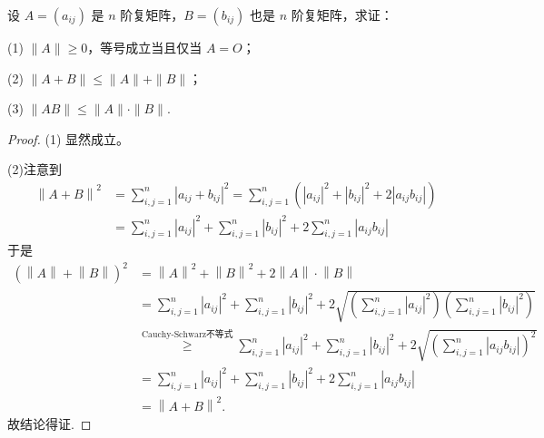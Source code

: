 \documentclass[../../main.tex]{subfiles}%
\begin{document}
\begin{proposition}[矩阵的范数的基本性质]\label{proposition:矩阵的范数的基本性质}
设 $A=(a_{ij})$ 是 $n$ 阶复矩阵，$B=(b_{ij})$ 也是 $n$ 阶复矩阵，求证：

(1) $\|A\|\geqslant  0$，等号成立当且仅当 $A = O$；

(2) $\|A + B\|\leqslant  \|A\| + \|B\|$；

(3) $\|AB\|\leqslant  \|A\|\cdot\|B\|$.
\end{proposition}
\begin{proof}

(1) 显然成立。

(2)注意到
\begin{align*}
\left\| A+B \right\| ^2&=\sum_{i,j=1}^n{\left| a_{ij}+b_{ij} \right|^2}=\sum_{i,j=1}^n{\left( \left| a_{ij} \right|^2+\left| b_{ij} \right|^2+2\left| a_{ij}b_{ij} \right| \right)}\\
&=\sum_{i,j=1}^n{\left| a_{ij} \right|^2}+\sum_{i,j=1}^n{\left| b_{ij} \right|^2}+2\sum_{i,j=1}^n{\left| a_{ij}b_{ij} \right|}
\end{align*}
于是
\begin{align*}
\left( \left\| A \right\| +\left\| B \right\| \right) ^2&=\left\| A \right\| ^2+\left\| B \right\| ^2+2\left\| A \right\| \cdot \left\| B \right\| \\
&=\sum_{i,j=1}^n{\left| a_{ij} \right|^2}+\sum_{i,j=1}^n{\left| b_{ij} \right|^2}+2\sqrt{\left( \sum_{i,j=1}^n{\left| a_{ij} \right|^2} \right) \left( \sum_{i,j=1}^n{\left| b_{ij} \right|^2} \right)}\\
&\overset{\text{Cauchy-Schwarz不等式}}{\geqslant}\sum_{i,j=1}^n{\left| a_{ij} \right|^2}+\sum_{i,j=1}^n{\left| b_{ij} \right|^2}+2\sqrt{\left( \sum_{i,j=1}^n{\left| a_{ij}b_{ij} \right|} \right) ^2}\\
&=\sum_{i,j=1}^n{\left| a_{ij} \right|^2}+\sum_{i,j=1}^n{\left| b_{ij} \right|^2}+2\sum_{i,j=1}^n{\left| a_{ij}b_{ij} \right|}\\
&=\left\| A+B \right\| ^2.
\end{align*}
故结论得证.


\end{proof}
\end{document}
